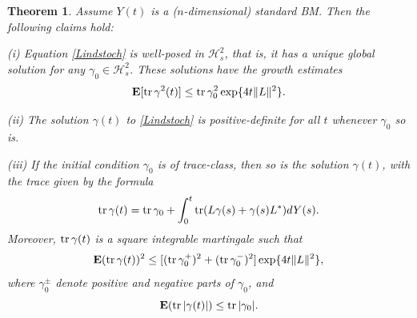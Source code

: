 \documentclass[12pt]{article}
\def\HC{\mathcal{H}}
\def\E{\mathbf{E}}
\def\tr{\rm{tr}}
\def\ga{\gamma}
\newtheorem{theorem}{Theorem}[section]
\newtheorem{remark}{Remark}
\begin{document}
\begin{theorem}
\label{LindStochLin1}
Assume $Y(t)$ is a ($n$-dimensional) standard BM.
 Then the following claims hold:

(i) Equation \eqref{Lindstoch} is well-posed in $\HC^2_s$, that is,
it has a unique global solution for any $\ga_0\in \HC^2_s$.
These solutions have the growth estimates
 \begin{equation}
\label{Lindstochquadex1}
\E [{\tr}\, \ga^2(t)] \le {\tr}\, \ga_0^2 \exp\{ 4 t\|L\|^2\}.
\end{equation}

(ii) The solution $\ga (t)$ to \eqref{Lindstoch}
is positive-definite for all $t$ whenever $\ga_0$ so is.

(iii) If the initial condition $\ga_0$ is of trace-class,
then so is the solution $\ga(t)$, with the trace given by the formula
\begin{equation}
\label{Lindstochmart}
{\tr} \,\ga(t)={\tr} \, \ga_0+\int_0^t {\tr} (L\ga(s)+\ga(s) L^*) dY(s).
\end{equation}
Moreover, ${\tr} \, \ga(t)$ is a
square integrable martingale such that
\begin{equation}
\label{Lindstochmart1}
\E ({\tr} \,\ga(t))^2\le [({\tr} \, \ga_0^+)^2 +({\tr} \, \ga_0^-)^2]\exp\{ 4t \|L\|^2\},
\end{equation}
where $\ga_0^{\pm}$ denote positive and negative parts of $\ga_0$, and
\begin{equation}
\label{Lindstochmart2}
\E ({\tr} \,|\ga(t)|)\le {\tr} \, |\ga_0|.
\end{equation}

\end{theorem}

\end{document}
